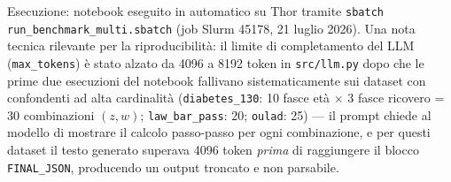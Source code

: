 Esecuzione: notebook eseguito in automatico su Thor tramite \texttt{sbatch run\_benchmark\_multi.sbatch} (job Slurm 45178, 21 luglio 2026). Una nota tecnica rilevante per la riproducibilit\`a: il limite di completamento del LLM (\texttt{max\_tokens}) \`e stato alzato da 4096 a 8192 token in \texttt{src/llm.py} dopo che le prime due esecuzioni del notebook fallivano sistematicamente sui dataset con confondenti ad alta cardinalit\`a (\texttt{diabetes\_130}: 10 fasce et\`a $\times$ 3 fasce ricovero = 30 combinazioni $(z,w)$; \texttt{law\_bar\_pass}: 20; \texttt{oulad}: 25) --- il prompt chiede al modello di mostrare il calcolo passo-passo per ogni combinazione, e per questi dataset il testo generato superava 4096 token \emph{prima} di raggiungere il blocco \texttt{FINAL\_JSON}, producendo un output troncato e non parsabile.

\begin{table}[htbp]
\centering
{}
\caption{Configurazione SFM per ciascuno dei 10 dataset benchmark.}
\label{tab:multi-config}
\end{table}


